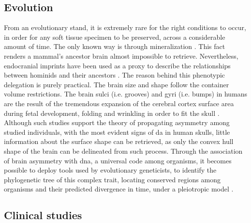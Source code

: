  \subsection{Evolution}
 From an evolutionary stand, it is extremely rare for the right conditions to occur, in order for any soft tissue specimen to be preserved, across a considerable amount of time. The only known way is through mineralization \cite{Purnell2018}. This fact renders a mammal's ancestor brain almost impossible to retrieve. Nevertheless, endocranial imprints have been used as a proxy to describe the relationships between hominids and their ancestors \cite{Balzeau2012}\cite{Neubauer2020}. The reason behind this phenotypic delegation is purely practical. The brain size and shape follow the container volume restrictions. The brain sulci (i.e. grooves) and gyri (i.e. bumps) in humans are the result of the tremendous expansion of the cerebral cortex surface area during fetal development, folding and wrinkling in order to fit the skull \cite{F.Bear2016}. Although such studies support the theory of propagating asymmetry among studied individuals, with the most evident signs of \ac{da} in human skulls, little information about the surface shape can be retrieved, as only the convex hull shape of the brain can be delineated from such process. Through the association of brain asymmetry with \acs{dna}, a universal code among organisms, it becomes possible to deploy tools used by evolutionary geneticists, to identify the phylogenetic tree of this complex trait, locating conserved regions among organisms and their predicted divergence in time, under a pleiotropic model \cite{Koch2021}.
 \subsection{Clinical studies}
 